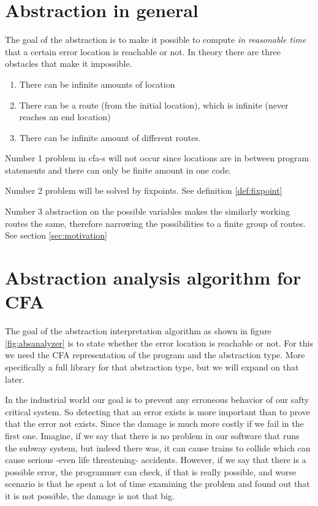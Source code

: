 \section{Abstraction in general}
\label{sec:general}

The goal of the abstraction is to make it possible to compute \emph{in reasonable time} that a certain error location is reachable or not. In theory there are three obstacles that make it impossible.

\begin{enumerate}
	\item There can be infinite amounts of location
	\item There can be a route (from the initial location), which is infinite (never reaches an end location)
	\item There can be infinite amount of different routes.
\end{enumerate}

Number 1 problem in cfa-s will not occur since locations are in between program statements and there can only be finite amount in one code.

Number 2 problem will be solved by fixpoints. See definition \ref{def:fixpoint}

Number 3 abstraction on the possible variables makes the similarly working routes the same, therefore narrowing the possibilities to a finite group of routes. See section \ref{sec:motivation}

\section{Abstraction analysis algorithm for CFA}
\label{sec:cfaalgorithm}

The goal of the abstraction interpretation algorithm as shown in figure \ref{fig:absanalyzer} is to state whether the error location is reachable or not. For this we need the CFA representation of the program and the abstraction type. More specifically a full library for that abstraction type, but we will expand on that later.

In the industrial world our goal is to prevent any erroneous behavior of our safty critical system. So detecting that an error exists is more important than to prove that the error not exists. Since the damage is much more costly if we fail in the first one. Imagine, if we say that there is no problem in our software that runs the subway system, but indeed there was, it can cause trains to collide which can cause serious -even life threatening- accidents. However, if we say that there is a possible error, the programmer can check, if that is really possible, and worse scenario is that he spent a lot of time examining the problem and found out that it is not possible, the damage is not that big.

